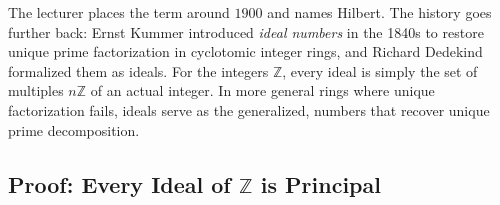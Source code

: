 \begin{aiNote}
The lecturer places the term around $1900$ and names Hilbert. The history goes further back: Ernst Kummer introduced \emph{ideal numbers} in the 1840s to restore unique prime factorization in cyclotomic integer rings, and Richard Dedekind formalized them as ideals. For the integers $\mathbb{Z}$, every ideal is simply the set of multiples $n\mathbb{Z}$ of an actual integer. In more general rings where unique factorization fails, ideals serve as the generalized,  numbers that recover unique prime decomposition.
\end{aiNote}

\begin{hidden}
\end{hidden}

\subsection{Proof: Every Ideal of \texorpdfstring{$\mathbb{Z}$}{Z} is Principal}

\begin{content}
\end{content}

